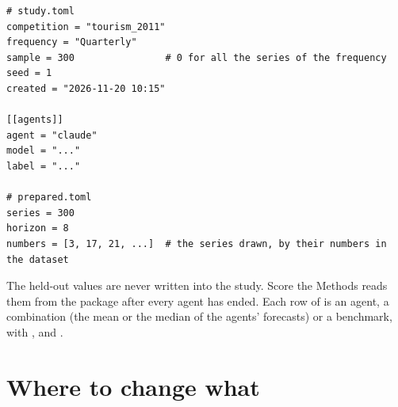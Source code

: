 \begin{lstlisting}
# study.toml
competition = "tourism_2011"
frequency = "Quarterly"
sample = 300                # 0 for all the series of the frequency
seed = 1
created = "2026-11-20 10:15"

[[agents]]
agent = "claude"
model = "..."
label = "..."

# prepared.toml
series = 300
horizon = 8
numbers = [3, 17, 21, ...]  # the series drawn, by their numbers in the dataset
\end{lstlisting}

The held-out values are never written into the study. Score the Methods reads them from the package after every agent
has ended. Each row of  is an agent, a combination (the mean or the median of the agents'
forecasts) or a benchmark, with ,  and .

\section{Where to change what}

